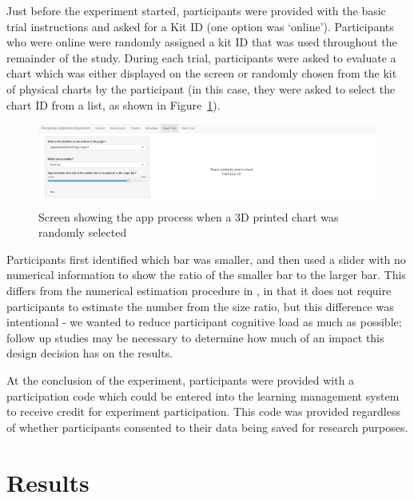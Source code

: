 \documentclass[runningheads
]{llncs}
\begin{document}
Just before the experiment started, participants were provided with the
basic trial instructions and asked for a Kit ID (one option was
`online'). Participants who were online were randomly assigned a kit ID
that was used throughout the remainder of the study. During each trial,
participants were asked to evaluate a chart which was either displayed
on the screen or randomly chosen from the kit of physical charts by the
participant (in this case, they were asked to select the chart ID from a
list, as shown in Figure~\ref{fig-chart-id}).

\begin{figure}

{\centering \includegraphics{image/05-Experiment-01-filled-in.png}

}

\caption{\label{fig-chart-id}Screen showing the app process when a 3D
printed chart was randomly selected}

\end{figure}

Participants first identified which bar was smaller, and then used a
slider with no numerical information to show the ratio of the smaller
bar to the larger bar. This differs from the numerical estimation
procedure in \textcite{clevelandGraphicalPerceptionTheory1984}, in that
it does not require participants to estimate the number from the size
ratio, but this difference was intentional - we wanted to reduce
participant cognitive load as much as possible; follow up studies may be
necessary to determine how much of an impact this design decision has on
the results.

At the conclusion of the experiment, participants were provided with a
participation code which could be entered into the learning management
system to receive credit for experiment participation. This code was
provided regardless of whether participants consented to their data
being saved for research purposes.

\hypertarget{results}{%
\section{Results}\label{results}}
\end{document}
